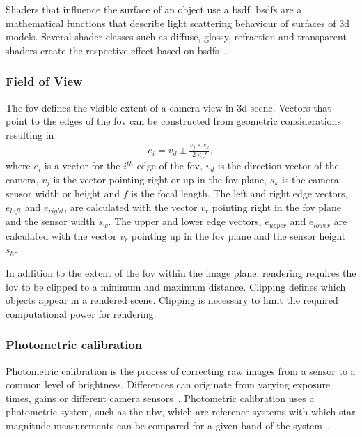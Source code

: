 Shaders that influence the surface of an object use a \gls{bsdf}. \glspl{bsdf} are a mathematical functions that describe light scattering behaviour of surfaces of \gls{3d} models. Several shader classes such as diffuse, glossy, refraction and transparent shaders create the respective effect based on \glspl{bsdf}~\cite{FoundationCyclesIntroduction, Pharr2010ChapterMaterials}.

\subsubsection{Field of View}
The \gls{fov} defines the visible extent of a camera view in \gls{3d} scene. Vectors that point to the edges of the \gls{fov} can be constructed from geometric considerations resulting in
\begin{align}
    e_{i} = v_d \pm \frac{v_j \times s_k}{2 \times f}, \label{eq:fov_edge}
\end{align}
where $e_{i}$ is a vector for the $i^{th}$ edge of the \gls{fov}, $v_d$ is the direction vector of the camera, $v_j$ is the vector pointing right or up in the \gls{fov} plane, $s_k$ is the camera sensor width or height and $f$ is the focal length. The left and right edge vectors, $e_{left}$ and $e_{right}$, are calculated with the vector $v_r$ pointing right in the \gls{fov} plane and the sensor width $s_w$. The upper and lower edge vectors, $e_{upper}$ and $e_{lower}$  are calculated with the vector $v_r$ pointing up in the \gls{fov} plane and the sensor height $s_h$.

In addition to the extent of the \gls{fov} within the image plane, rendering requires the \gls{fov} to be clipped to a minimum and maximum distance. Clipping defines which objects appear in a rendered scene. Clipping is necessary to limit the required computational power for rendering. 

\subsubsection{Photometric calibration} \label{sec:photo_cal}
Photometric calibration is the process of correcting raw images from a sensor to a common level of brightness. Differences can originate from varying exposure times, gains or different camera sensors~\cite{Bergmann2018OnlineSLAM}. Photometric calibration uses a photometric system, such as the \gls{ubv}, which are reference systems with which star magnitude measurements can be compared for a given band of the system~\cite{Bessell1979UBVRIPhotometry}.

